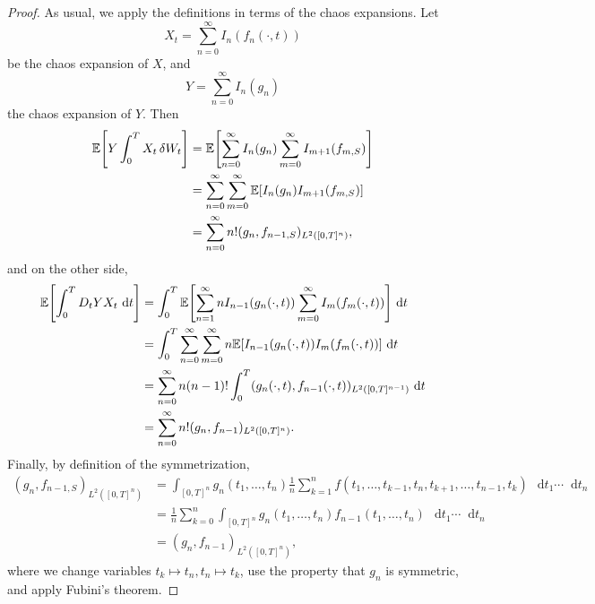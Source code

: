 \documentclass[11pt, a4paper, twoside]{book}
\theoremstyle{plain}
\theoremstyle{definition}
\theoremstyle{remark}
\renewcommand{\d}{\mathop{}\!\mathrm{d}}
\newcommand{\bbE}{\mathbb{E}}
\DeclarePairedDelimiter{\brackets}{\lbrack}{\rbrack}
\begin{document}
\begin{proof}
	As usual, we apply the definitions in terms of the chaos expansions. Let
	\[
		X_t = \sum_{n = 0}^\infty I_n(f_n(\cdot, t))
	\]
	be the chaos expansion of $X$, and
	\[
		Y = \sum_{n = 0}^\infty I_n(g_n)
	\]
	the chaos expansion of $Y$. Then
	\begin{align*}
		\bbE\brackets*{
			Y \int_0^T X_t \, \delta{W}_t
		}
		 & = \bbE\brackets*{
			\sum_{n = 0}^\infty I_n(g_n)
			\sum_{m = 0}^\infty I_{m + 1}({f}_{m,S})
		}                                                                 \\
		 & = \sum_{n = 0}^\infty \sum_{m = 0}^\infty
		\bbE[I_n(g_n) I_{m + 1}({f}_{m,S})]                               \\
		 & = \sum_{n = 0}^\infty n! (g_n, {f}_{n - 1,S})_{L^2([0, T]^n)},
	\end{align*}
	and on the other side,
	\begin{align*}
		\bbE\brackets*{
		\int_0^T D_t{Y} X_t \, \d{t}
		}
		 & = \int_0^T \bbE\brackets*{
			\sum_{n = 1}^\infty n I_{n - 1}(g_n(\cdot, t))
			\sum_{m = 0}^\infty I_m(f_m(\cdot, t))
		} \, \d{t}                                            \\
		 & = \int_0^T \sum_{n = 0}^\infty \sum_{m = 0}^\infty
		n \bbE\brackets{
			I_{n - 1}(g_n(\cdot, t)) I_m(f_m(\cdot, t))
		} \, \d{t}                                            \\
		 & = \sum_{n = 0}^\infty
		n (n - 1)! \int_0^T
		(g_n(\cdot, t), f_{n - 1}(\cdot, t))_{L^2([0, T]^{n - 1})}
		\, \d{t}                                              \\
		 & = \sum_{n = 0}^\infty
		n! (g_n, f_{n - 1})_{L^2([0, T]^n)}.
	\end{align*}
	Finally, by definition of the symmetrization,
	\begin{align*}
		(g_n, f_{n - 1,S})_{L^2([0, T]^n)}
		 & = \int_{[0, T]^n}
		g_n(t_1, \dots, t_n)
		\frac{1}{n} \sum_{k = 1}^n
		f(t_1, \dots, t_{k - 1}, t_n, t_{k + 1}, \dots, t_{n - 1}, t_k)
		\, \d{t_1} \cdots \d{t_n}                       \\
		 & = \frac{1}{n} \sum_{k = 0}^n \int_{[0, T]^n}
		g_n(t_1, \dots, t_n)
		f_{n - 1}(t_1, \dots, t_n)
		\, \d{t_1} \cdots \d{t_n}                       \\
		 & = (g_n, f_{n - 1})_{L^2([0, T]^n)},
	\end{align*}
	where we change variables $t_k \mapsto t_n, t_n \mapsto t_k$, use the
	property that $g_n$ is symmetric, and apply Fubini's theorem.
\end{proof}
\end{document}
